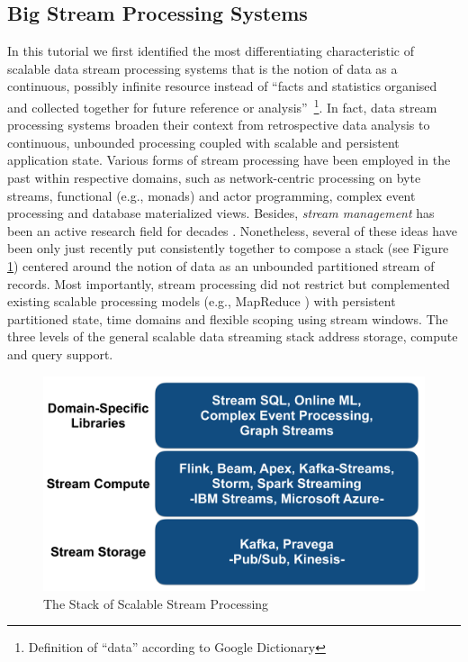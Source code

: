 
\subsection{Big Stream Processing Systems} 
\label{sec:tut_systems}

In this tutorial we first identified the most differentiating characteristic of scalable data stream processing systems that is the notion of data as a continuous, possibly infinite resource instead of ``facts and statistics organised and collected together for future reference or analysis''~\footnote{Definition of ``data'' according to Google Dictionary}. In fact, data stream processing systems broaden their context from retrospective data analysis to continuous, unbounded processing coupled with scalable and persistent application state.  Various forms of stream processing have been employed in the past within respective domains, such as network-centric processing on byte streams, functional (e.g., monads) and actor programming, complex event processing and database materialized views. Besides, \emph{stream management} has been an active research field for decades \cite{cherniack2003scalable,chandrasekaran2003telegraphcq,abadi2003aurora,arasu2004stream}. Nonetheless, several of these ideas have been only just recently put consistently together to compose a stack (see Figure \ref{fig:streamstack}) centered around the notion of data as an unbounded partitioned stream of records. Most importantly, stream processing did not restrict but complemented existing scalable processing models (e.g., MapReduce \cite{dean2008mapreduce}) with persistent partitioned state, time domains and flexible scoping using stream windows. The three levels of the general scalable data streaming stack address storage, compute and query support.

\begin{figure}[t]
\centering
\includegraphics[width=0.4 \textwidth]{pictures/streamstack.pdf}
\caption{The Stack of Scalable Stream Processing}
\label{fig:streamstack}
\end{figure}

